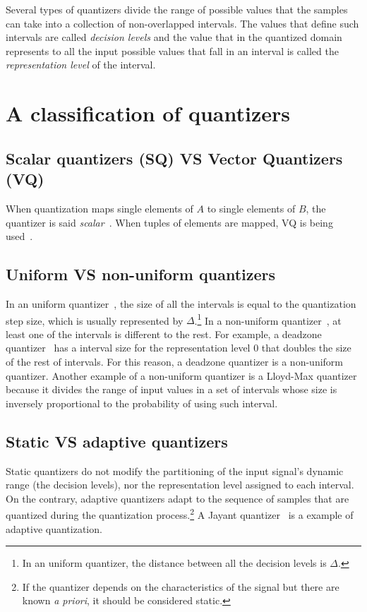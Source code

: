 Several types of quantizers divide the range of possible values that
the samples can take into a collection of non-overlapped
intervals. The values that define such intervals are called
\emph{decision levels} and the value that in the quantized domain
represents to all the input possible values that fall in an interval is
called the \emph{representation level} of the interval.

\section{A classification of quantizers}

\subsection{Scalar quantizers (SQ) VS Vector Quantizers (VQ)}

When quantization maps single elements of $A$ to single elements of
$B$, the quantizer is said
\emph{scalar}~\cite{vruiz__scalar_quantization}. When tuples of
elements are mapped, VQ is being
used~\cite{vruiz__vector_quantization}.

\subsection{Uniform VS non-uniform quantizers}

In an uniform quantizer~\cite{vruiz__scalar_quantization}, the size of
all the intervals is equal to the quantization step size, which is
usually represented by $\Delta$.\footnote{In an uniform quantizer, the
distance between all the decision levels is $\Delta$.} In a
non-uniform quantizer~\cite{vruiz__scalar_quantization}, at least one
of the intervals is different to the rest. For example, a deadzone
quantizer~\cite{vruiz__scalar_quantization} has a interval size for
the representation level 0 that doubles the size of the rest of
intervals. For this reason, a deadzone quantizer is a non-uniform
quantizer. Another example of a non-uniform quantizer is a Lloyd-Max
quantizer because it divides the range of input values in a set of
intervals whose size is inversely proportional to the probability of
using such interval.

\subsection{Static VS adaptive quantizers}

Static quantizers do not modify the partitioning of the input signal's
dynamic range (the decision levels), nor the representation level
assigned to each interval. On the contrary, adaptive quantizers adapt
to the sequence of samples that are quantized during the quantization
process.\footnote{If the quantizer depends on the characteristics of
the signal but there are known \emph{a priori}, it should be
considered static.} A Jayant
quantizer~\cite{vruiz__scalar_quantization} is a example of adaptive
quantization.

